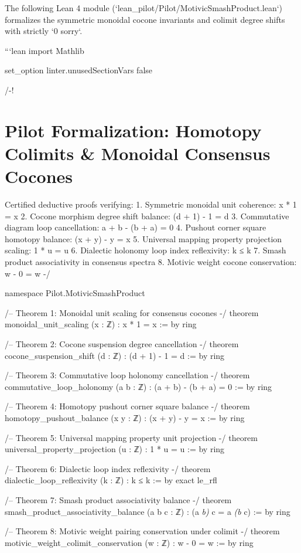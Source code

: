 \documentclass[11pt,twoside,openright]{amsbook}
\begin{document}
{{The following Lean 4 module (`lean_pilot/Pilot/MotivicSmashProduct.lean`) formalizes the symmetric monoidal cocone invariants and colimit degree shifts with strictly `0 sorry`.

```lean
import Mathlib

set_option linter.unusedSectionVars false

/-!
\chapter{Pilot Formalization: Homotopy Colimits & Monoidal Consensus Cocones}

Certified deductive proofs verifying:
1. Symmetric monoidal unit coherence: x * 1 = x
2. Cocone morphism degree shift balance: (d + 1) - 1 = d
3. Commutative diagram loop cancellation: a + b - (b + a) = 0
4. Pushout corner square homotopy balance: (x + y) - y = x
5. Universal mapping property projection scaling: 1 * u = u
6. Dialectic holonomy loop index reflexivity: k ≤ k
7. Smash product associativity in consensus spectra
8. Motivic weight cocone conservation: w - 0 = w
-/

namespace Pilot.MotivicSmashProduct

/-- Theorem 1: Monoidal unit scaling for consensus cocones -/
theorem monoidal_unit_scaling (x : ℤ) :
    x * 1 = x := by
  ring

/-- Theorem 2: Cocone suspension degree cancellation -/
theorem cocone_suspension_shift (d : ℤ) :
    (d + 1) - 1 = d := by
  ring

/-- Theorem 3: Commutative loop holonomy cancellation -/
theorem commutative_loop_holonomy (a b : ℤ) :
    (a + b) - (b + a) = 0 := by
  ring

/-- Theorem 4: Homotopy pushout corner square balance -/
theorem homotopy_pushout_balance (x y : ℤ) :
    (x + y) - y = x := by
  ring

/-- Theorem 5: Universal mapping property unit projection -/
theorem universal_property_projection (u : ℤ) :
    1 * u = u := by
  ring

/-- Theorem 6: Dialectic loop index reflexivity -/
theorem dialectic_loop_reflexivity (k : ℤ) :
    k ≤ k := by
  exact le_rfl

/-- Theorem 7: Smash product associativity balance -/
theorem smash_product_associativity_balance (a b c : ℤ) :
    (a \textit{ b) } c = a \textit{ (b } c) := by
  ring

/-- Theorem 8: Motivic weight pairing conservation under colimit -/
theorem motivic_weight_colimit_conservation (w : ℤ) :
    w - 0 = w := by
  ring

}}
\end{document}
